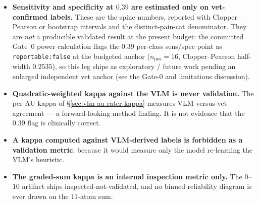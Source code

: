 \begin{itemize}
  \item \textbf{Sensitivity and specificity at $0.39$ are estimated only on
  vet-confirmed labels.} These are the spine numbers, reported with
  Clopper--Pearson or bootstrap intervals and the distinct-pain-cat denominator.
  They are \emph{not} a producible validated result at the present budget: the
  committed Gate~0 power calculation flags the $0.39$ per-class sens/spec point as
  \texttt{reportable:false} at the budgeted anchor ($n_{\text{pos}}=16$,
  Clopper--Pearson half-width $0.2535$), so this leg ships as exploratory /
  future work pending an enlarged independent vet anchor (see the Gate-0 and
  limitations discussion).
  \item \textbf{Quadratic-weighted kappa against the VLM is never validation.}
  The per-AU kappa of \S\ref{sec:vlm-au-rater-kappa} measures VLM-versus-vet
  agreement --- a forward-looking method finding. It is not evidence that the
  $0.39$ flag is clinically correct.
  \item \textbf{A kappa computed against VLM-derived labels is forbidden as a
  validation metric}, because it would measure only the model re-learning the
  VLM's heuristic.
  \item \textbf{The graded-sum kappa is an internal inspection metric only.} The
  $0$--$10$ artifact ships inspected-not-validated, and no binned reliability
  diagram is ever drawn on the $11$-atom sum.
\end{itemize}

